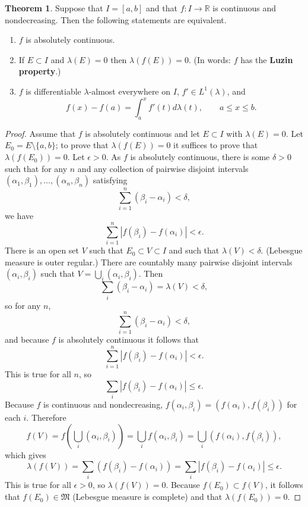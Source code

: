 \documentclass{article}
\theoremstyle{definition}
\newtheorem{theorem}{Theorem}
\theoremstyle{definition}
\begin{document}
\begin{theorem}
Suppose that $I=[a,b]$ and that $f:I \to \mathbb{R}$ is continuous and nondecreasing. Then the following statements are equivalent.
\begin{enumerate}
\item $f$ is absolutely continuous.
\item If $E \subset I$ and $\lambda(E)=0$ then $\lambda(f(E))=0$. (In words: $f$ has the \textbf{Luzin property}.)
\item $f$ is differentiable $\lambda$-almost everywhere on $I$, $f' \in L^1(\lambda)$, and 
\[
f(x)-f(a)=\int_a^x f'(t) d\lambda(t), \qquad a \leq x \leq b.
\]
\end{enumerate}
\label{TFAE}
\end{theorem}
\begin{proof}
Assume that $f$ is absolutely continuous and let $E \subset I$ with $\lambda(E)=0$. Let $E_0=E \setminus \{a,b\}$; to prove that
$\lambda(f(E))=0$ it suffices to prove that $\lambda(f(E_0))=0$. 
Let $\epsilon>0$.
As $f$ is absolutely continuous, there is some $\delta>0$ such that
for any $n$ and any
collection of pairwise disjoint intervals $(\alpha_1,\beta_1),\ldots,(\alpha_n,\beta_n)$
satisfying
\[
\sum_{i=1}^n (\beta_i-\alpha_i) < \delta,
\]
we have
\[
\sum_{i=1}^n |f(\beta_i)-f(\alpha_i)|<\epsilon.
\]
There is an open set $V$ such that $E_0 \subset V \subset I$ and such that $\lambda(V)<\delta$. (Lebesgue measure is outer regular.)
There are countably many pairwise disjoint intervals $(\alpha_i,\beta_i)$ such that
$V=\bigcup_i (\alpha_i,\beta_i)$. Then
\[
\sum_i (\beta_i-\alpha_i) = \lambda(V) < \delta,
\]
 so
for any $n$,
\[
\sum_{i=1}^n (\beta_i-\alpha_i) < \delta,
\]
and
because $f$ is absolutely continuous it follows that
\[
\sum_{i=1}^n |f(\beta_i)-f(\alpha_i)|<\epsilon.
\]
This is true for all $n$, so
\[
\sum_i  |f(\beta_i)-f(\alpha_i)| \leq \epsilon.
\]
Because $f$ is continuous and nondecreasing, $f(\alpha_i,\beta_i) = (f(\alpha_i),f(\beta_i))$ for each $i$. Therefore
\[
f(V) = f\left(\bigcup_i (\alpha_i,\beta_i)\right)=\bigcup_i f(\alpha_i,\beta_i)
= \bigcup_i  (f(\alpha_i),f(\beta_i)),
\]
which gives 
\[
\lambda(f(V)) = \sum_i (f(\beta_i)-f(\alpha_i)) = \sum_i |f(\beta_i)-f(\alpha_i)| \leq \epsilon.
\]
This is true for all $\epsilon>0$, so 
$\lambda(f(V))=0$. Because $f(E_0)\subset f(V)$, it follows that $f(E_0) \in \mathfrak{M}$ (Lebesgue measure is complete) and that
$\lambda(f(E_0))=0$.


\end{proof}
\end{document}
